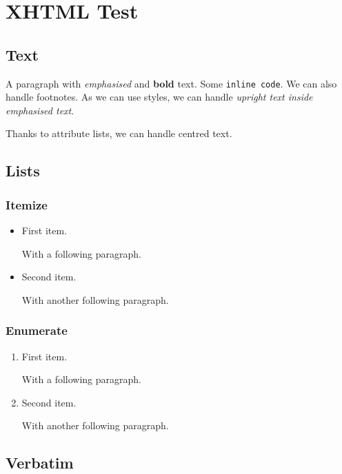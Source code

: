 \documentclass[
  text,
  xhtml,
  itex
]{internet}
\renewcommand\footnote[1]{}
\begin{document}
\section{XHTML Test}

\subsection{Text}

A paragraph with \emph{emphasised} and \textbf{bold} text.
Some \verb+inline code+.
We can also handle footnotes\footnote{with aplomb}.
As we can use styles, we can handle \emph{upright \textup{text} inside emphasised text}.
\begin{center}
Thanks to attribute lists, we can handle centred text.
\end{center}

\subsection{Lists}

\subsubsection{Itemize}

\begin{itemize}
\item First item.

With a following paragraph\footnote{that has a footnote}.

\item Second item.

With another following paragraph.
\end{itemize}

\subsubsection{Enumerate}

\begin{enumerate}
\item First item.

With a following paragraph.

\item Second item.

With another following paragraph.
\end{enumerate}


\subsection{Verbatim}
\end{document}
